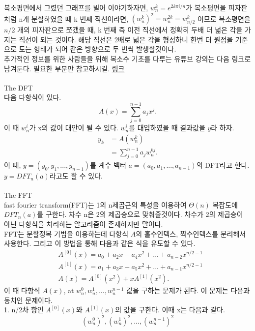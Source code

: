 \documentclass{article}
\begin{document}
복소평면에서 그렸던 그래프를 빌어 이야기하자면, $w_n^k = e^{2 k \pi i /n}$가 복소평면을 피자판처럼 n개 분할하였을 때 k 번째 직선이라면, 
$(w_n^k)^2 = w_n^{2k} = w_{n/2}^k$ 이므로 복소평면을 $n/2$ 개의 피자판으로 쪼갰을 때, k 번째 즉 이전 직선에서 정확히 두배 더 넓은 각을 가지는 
직선이 되는 것이다. 해당 직선은 2배로 넓은 각을 형성하니 한번 더 원점을 기준으로 도는 형태가 되어 같은 방향으로 두 번씩 발생할것이다. 
\\
추가적인 정보를 위한 사람들을 위해 복소수 기초를 다루는 유튜브 강의는 다음 링크로 남겨둔다. 필요한 부분만 참고하시길. 
\href{https://www.youtube.com/watch?v=-dOliRrDQ8k}{링크}
\\
\\
\vspace{5mm}
\Large{The DFT}
\normalsize
\\
다음 다항식이 있다.
$$
A(x) = \sum_{j=0}^{n-1}a_jx^j.
$$
이 때 $w_n^i$가 x의 값이 대안이 될 수 있다. $w_n^i$를 대입하였을 때 결과값을 $y$라 하자.
\begin{align*}
    y_k &= A(w_n^k)\\
    &=\sum_{j=0}^{n-1}a_jw_n^{kj}.
\end{align*}
이 때, $y =(y_0, y_1, ... , y_{n-1})$를 계수 벡터 $a=(a_0, a_1, ... ,a_{n-1})$의 DFT라고 한다.   
$y=DFT_n(a)$라고도 할 수 있다.
\\
\\
\vspace{5mm}
\Large{The FFT}
\normalsize
\\
fast fourier transform(FFT)는 1의 n제곱근의 특성을 이용하여 $\Theta (n)$ 복잡도에 $DFT_n(a)$를 구한다. 
차수 n은 2의 제곱승으로 맞춰줄것이다. 차수가 2의 제곱승이 아닌 다항식을 처리하는 알고리즘이 존재하지만 말이다. 
\\
FFT는 분할정복 기법을 이용하는데 다항식 $A$의 홀수인덱스, 짝수인덱스를 분리해서 사용한다. 
그리고 이 방법을 통해 다음과 같은 식을 유도할 수 있다. 
\begin{align*}
    &A^{[0]}(x) = a_0 + a_2x + a_4x^2 + ... + a_{n-2}x^{n/2-1}\\
    &A^{[1]}(x) = a_1 + a_3x + a_5x^2 + ... + a_{n-1}x^{n/2-1}\\
    &A(x)=A^{[0]}(x^2)+xA^{[1]}(x^2).\tag{1}
\end{align*}
이 때 다항식 $A(x)$, at $w_n^0, w_n^1, ... , w_n^{n-1}$ 값을 구하는 문제가 된다. 
이 문제는 다음과 동치인 문제이다. 
\\
1. n/2차 항인 $A^{[0]}(x)$와 $A^{[1]}(x)$의 값을 구한다. 이때 x는 다음과 같다. 
\[
    (w_n^0)^2, (w_n^1)^2, ..., (w_n^{n-1})^2\tag{2}
\]
\end{document}
